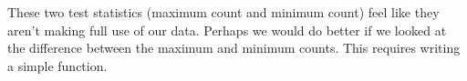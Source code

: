 \begin{knitrout}
\end{knitrout}


These two test statistics (maximum count and minimum count) feel like they aren't 
making full use of our data.  
Perhaps we would do better if we looked at the difference between the maximum and 
minimum counts.
This requires writing a simple function.

